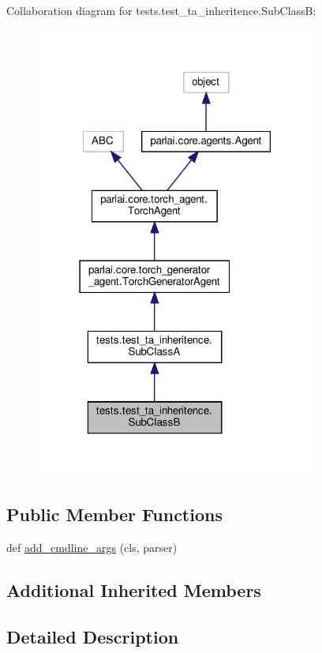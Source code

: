 Collaboration diagram for tests.\+test\+\_\+ta\+\_\+inheritence.\+Sub\+ClassB\+:
\nopagebreak
\begin{figure}[H]
\begin{center}
\leavevmode
\includegraphics[width=261pt]{dd/df5/classtests_1_1test__ta__inheritence_1_1SubClassB__coll__graph}
\end{center}
\end{figure}
\subsection*{Public Member Functions}
\begin{DoxyCompactItemize}
\item 
def \hyperlink{classtests_1_1test__ta__inheritence_1_1SubClassB_a9aa7384116305903fbf530d4710e83a3}{add\+\_\+cmdline\+\_\+args} (cls, parser)
\end{DoxyCompactItemize}
\subsection*{Additional Inherited Members}


\subsection{Detailed Description}


